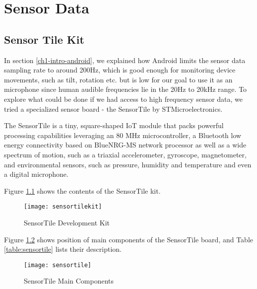 \chapter{Sensor Data}


\section{Sensor Tile Kit}

In section \ref{ch1-intro-android}, we explained how Android limits the sensor data sampling rate to around 200Hz, which is good enough for monitoring device movements, such as tilt, rotation etc.
but is low for our goal to use it as an microphone since human audible frequencies lie in the 20Hz to 20kHz range.
To explore what could be done if we had access to high frequency sensor data, we tried a specialized sensor board - the SensorTile by STMicroelectronics.

The SensorTile is a tiny, square-shaped IoT module that packs powerful processing capabilities leveraging an 80 MHz microcontroller, a Bluetooth low energy connectivity based on BlueNRG-MS network processor as well as a wide spectrum of motion, such as a triaxial accelerometer, gyroscope, magnetometer, and environmental sensors, such as pressure, humidity and temperature and even a digital microphone. \cite{stkit}

Figure \ref{fig:sensortilekit} shows the contents of the SensorTile kit.

\begin{figure}[H] \begin{center}
\texttt{[image: sensortilekit]}
\caption{SensorTile Development Kit}
\label{fig:sensortilekit}
\end{center} \end{figure}

\newpage

Figure \ref{fig:sensortile} shows position of main components of the SensorTile board, and Table \ref{table:sensortile} lists their description. \cite{stkitmanual}

\begin{figure}[H] \begin{center}
\texttt{[image: sensortile]}
\caption{SensorTile Main Components}
\label{fig:sensortile}
\end{center} \end{figure}

